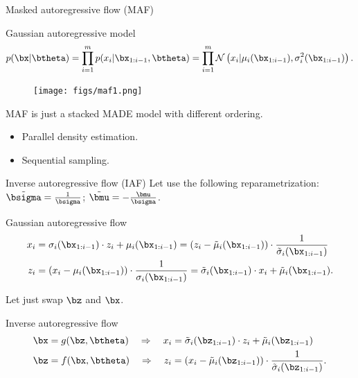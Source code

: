 \begin{frame}{Masked autoregressive flow (MAF)}
	\begin{block}{Gaussian autoregressive model}
		\vspace{-0.5cm}
		\[
		p(\bx | \btheta) = \prod_{i=1}^m p(x_i | \bx_{1:i - 1}, \btheta) = \prod_{i=1}^m \mathcal{N} \left(x_i | \mu_i(\bx_{1:i-1}), \sigma^2_i (\bx_{1:i-1})\right).
		\]
		\vspace{-0.5cm}
	\end{block}
	\begin{figure}
		\texttt{[image: figs/maf1.png]}
	\end{figure}
	MAF is just a stacked MADE model with different ordering.
	\begin{itemize}
		\item Parallel density estimation.
		\item Sequential sampling.
	\end{itemize}
\end{frame}
\begin{frame}{Inverse autoregressive flow (IAF)}
	Let use the following reparametrization:
	$\tilde{\bsigma} = \frac{1}{\bsigma}$; $ \tilde{\bmu} = - \frac{\bmu}{\bsigma}$.
	
	\begin{block}{Gaussian autoregressive flow}
		\vspace{-0.5cm}
		\begin{align*}
			x_i &= \sigma_i (\bx_{1:i-1}) \cdot z_i + \mu_i(\bx_{1:i-1}) =  \left( z_i - \tilde{\mu}_i(\bx_{1:i-1})\right) \cdot \frac{1}{\tilde{\sigma}_i (\bx_{1:i-1}) }\\
			z_i &= \left(x_i - \mu_i(\bx_{1:i-1}) \right) \cdot \frac{1}{ \sigma_i (\bx_{1:i-1})} = \tilde{\sigma}_i (\bx_{1:i-1}) \cdot x_i + \tilde{\mu}_i(\bx_{1:i-1}).
		\end{align*}
		\vspace{-0.3cm}
	\end{block}
	Let just swap $\bz$ and $\bx$. 
	
	\begin{block}{Inverse autoregressive flow}
		\vspace{-0.5cm}
		\begin{align*}
			\bx &= g(\bz, \btheta) \quad \Rightarrow \quad x_i = \tilde{\sigma}_i (\bz_{1:i-1}) \cdot z_i + \tilde{\mu}_i(\bz_{1:i-1}) \\
			\bz &= f(\bx, \btheta) \quad \Rightarrow \quad z_i = \left( x_i - \tilde{\mu}_i(\bz_{1:i-1})\right) \cdot \frac{1}{\tilde{\sigma}_i (\bz_{1:i-1}) }.
		\end{align*}
		\vspace{-0.3cm}
	\end{block}
	
\end{frame}
